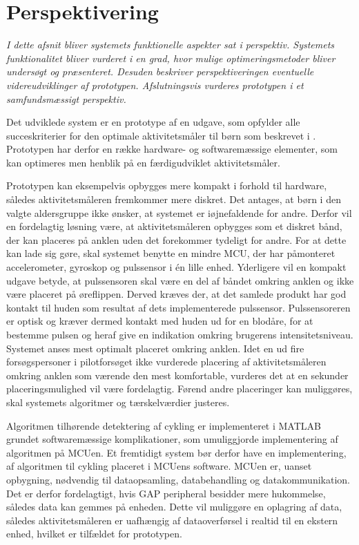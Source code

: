 \section{Perspektivering}\label{sec:perspektivering}
\textit{I dette afsnit bliver systemets funktionelle aspekter sat i perspektiv. Systemets funktionalitet bliver vurderet i en grad, hvor mulige optimeringsmetoder bliver undersøgt og præsenteret. Desuden beskriver perspektiveringen eventuelle videreudviklinger af prototypen. Afslutningsvis vurderes prototypen i et samfundsmæssigt perspektiv.}

Det udviklede system er en prototype af en udgave, som opfylder alle succeskriterier for den optimale aktivitetsmåler til børn som beskrevet i . Prototypen har derfor en række hardware- og softwaremæssige elementer, som kan optimeres men henblik på en færdigudviklet aktivitetsmåler.

Prototypen kan eksempelvis opbygges mere kompakt i forhold til hardware, således aktivitetsmåleren fremkommer mere diskret. Det antages, at børn i den valgte aldersgruppe ikke ønsker, at systemet er iøjnefaldende for andre. Derfor vil en fordelagtig løsning være, at aktivitetsmåleren opbygges som et diskret bånd, der kan placeres på anklen uden det forekommer tydeligt for andre. For at dette kan lade sig gøre, skal systemet benytte en mindre MCU, der har påmonteret accelerometer, gyroskop og pulssensor i én lille enhed. Yderligere vil en kompakt udgave betyde, at pulssensoren skal være en del af båndet omkring anklen og ikke være placeret på øreflippen. Derved kræves der, at det samlede produkt har god kontakt til huden som resultat af dets implementerede pulssensor. Pulssensoreren er optisk og kræver dermed kontakt med huden ud for en blodåre, for at bestemme pulsen og heraf give en indikation omkring brugerens intensitetsniveau. Systemet anses mest optimalt placeret omkring anklen. Idet en ud fire forsøgspersoner i pilotforsøget ikke vurderede placering af aktivitetsmåleren omkring anklen som værende den mest komfortable, vurderes det at en sekunder placeringsmulighed vil være fordelagtig. Førend andre placeringer kan muliggøres, skal systemets algoritmer og tærskelværdier justeres.  

Algoritmen tilhørende detektering af cykling er implementeret i MATLAB grundet softwaremæssige komplikationer, som umuliggjorde implementering af algoritmen på MCUen. Et fremtidigt system bør derfor have en implementering, af algoritmen til cykling placeret i MCUens software. MCUen er, uanset opbygning, nødvendig til dataopsamling, databehandling og datakommunikation. Det er derfor fordelagtigt, hvis GAP peripheral besidder mere hukommelse, således data kan gemmes på enheden. Dette vil muliggøre en oplagring af data, således aktivitetsmåleren er uafhængig af dataoverførsel i realtid til en ekstern enhed, hvilket er tilfældet for prototypen. 

